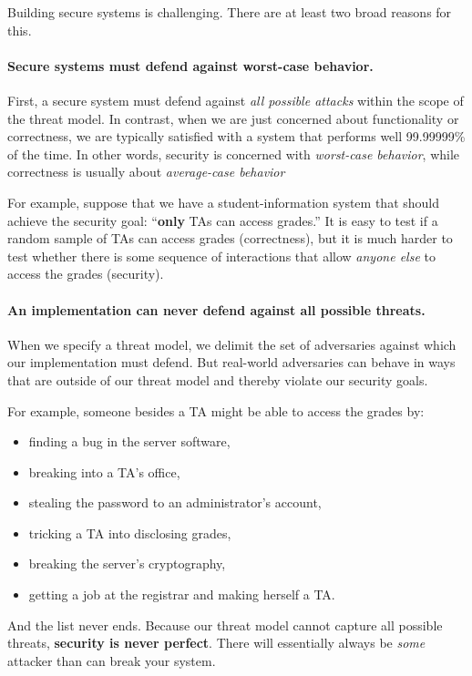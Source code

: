 Building secure systems is challenging.
There are at least two broad reasons for this.

\paragraph{Secure systems must defend against worst-case behavior.}
First, a secure system must defend against
\emph{all possible attacks} within the scope of 
the threat model.
In contrast, when we are just concerned about functionality or
correctness, we are typically satisfied with a system 
that performs well 99.99999\% of the time.
In other words, security is concerned with \emph{worst-case behavior},
while correctness is usually about \emph{average-case behavior}

For example, suppose that we have
a student-information system that should achieve the security
goal: ``\textbf{only} TAs can access grades.''
It is easy to test if a random sample of TAs can
access grades (correctness), but it is much harder to test whether
there is some sequence of interactions that allow
\textit{anyone else} to access the grades (security).

\paragraph{An implementation can never defend against all possible threats.}
When we specify a threat model, we delimit the set of adversaries 
against which our implementation must defend.
But real-world adversaries can behave in ways that are 
outside of our threat model and thereby violate our security goals.

For example, someone besides a TA might be able to
access the grades by:
\begin{itemize}
	\item finding a bug in the server software,
	\item breaking into a TA's office,
	\item stealing the password to an administrator's account,
	\item tricking a TA into disclosing grades,
	\item breaking the server's cryptography,
	\item getting a job at the registrar and making herself a TA.
\end{itemize}

And the list never ends. Because our threat model cannot capture all
possible threats, \textbf{security is never perfect}.
There will essentially always be \textit{some} attacker than can break your system.

